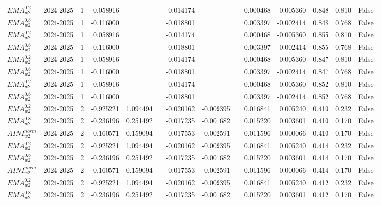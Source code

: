 \begin{tabular}{@{}llrrrrrrrrrlll@{}}
$EMA^{0.2}_{w2}$ & 2024-2025 & 1 & 0.058916 &  &  & -0.014174 &  &  & 0.000468 & -0.005360 & 0.848 & 0.810 & False \\
$EMA^{0.8}_{w2}$ & 2024-2025 & 1 & -0.116000 &  &  & -0.018801 &  &  & 0.003397 & -0.002414 & 0.848 & 0.768 & False \\
$EMA^{0.2}_{w2}$ & 2024-2025 & 1 & 0.058916 &  &  & -0.014174 &  &  & 0.000468 & -0.005360 & 0.855 & 0.810 & False \\
$EMA^{0.8}_{w2}$ & 2024-2025 & 1 & -0.116000 &  &  & -0.018801 &  &  & 0.003397 & -0.002414 & 0.855 & 0.768 & False \\
$EMA^{0.2}_{w2}$ & 2024-2025 & 1 & 0.058916 &  &  & -0.014174 &  &  & 0.000468 & -0.005360 & 0.847 & 0.810 & False \\
$EMA^{0.8}_{w2}$ & 2024-2025 & 1 & -0.116000 &  &  & -0.018801 &  &  & 0.003397 & -0.002414 & 0.847 & 0.768 & False \\
$EMA^{0.2}_{w2}$ & 2024-2025 & 1 & 0.058916 &  &  & -0.014174 &  &  & 0.000468 & -0.005360 & 0.852 & 0.810 & False \\
$EMA^{0.8}_{w2}$ & 2024-2025 & 1 & -0.116000 &  &  & -0.018801 &  &  & 0.003397 & -0.002414 & 0.852 & 0.768 & False \\
$EMA^{0.2}_{w2}$ & 2024-2025 & 2 & -0.925221 & 1.094494 &  & -0.020162 & -0.009395 &  & 0.016841 & 0.005240 & 0.410 & 0.232 & False \\
$EMA^{0.8}_{w2}$ & 2024-2025 & 2 & -0.236196 & 0.251492 &  & -0.017235 & -0.001682 &  & 0.015220 & 0.003601 & 0.410 & 0.170 & False \\
$AINI^{norm}_{w2}$ & 2024-2025 & 2 & -0.160571 & 0.159094 &  & -0.017553 & -0.002591 &  & 0.011596 & -0.000066 & 0.410 & 0.170 & False \\
$EMA^{0.2}_{w2}$ & 2024-2025 & 2 & -0.925221 & 1.094494 &  & -0.020162 & -0.009395 &  & 0.016841 & 0.005240 & 0.414 & 0.232 & False \\
$EMA^{0.8}_{w2}$ & 2024-2025 & 2 & -0.236196 & 0.251492 &  & -0.017235 & -0.001682 &  & 0.015220 & 0.003601 & 0.414 & 0.170 & False \\
$AINI^{norm}_{w2}$ & 2024-2025 & 2 & -0.160571 & 0.159094 &  & -0.017553 & -0.002591 &  & 0.011596 & -0.000066 & 0.414 & 0.170 & False \\
$EMA^{0.2}_{w2}$ & 2024-2025 & 2 & -0.925221 & 1.094494 &  & -0.020162 & -0.009395 &  & 0.016841 & 0.005240 & 0.412 & 0.232 & False \\
$EMA^{0.8}_{w2}$ & 2024-2025 & 2 & -0.236196 & 0.251492 &  & -0.017235 & -0.001682 &  & 0.015220 & 0.003601 & 0.412 & 0.170 & False \\

\end{tabular}
